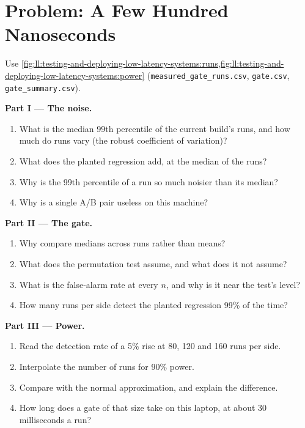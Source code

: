 \section{Problem: A Few Hundred Nanoseconds}

\begin{problem}\label{pb:ll:testing-and-deploying-low-latency-systems:1}
Use \cref{fig:ll:testing-and-deploying-low-latency-systems:runs,fig:ll:testing-and-deploying-low-latency-systems:power}
(\texttt{measured\_gate\_runs.csv}, \texttt{gate.csv}, \texttt{gate\_summary.csv}).

\medskip\noindent\textbf{Part I --- The noise.}
\begin{enumerate}
\item What is the median 99th percentile of the current build's runs, and how much do runs vary (the robust coefficient of
variation)?
\item What does the planted regression add, at the median of the runs?
\item Why is the 99th percentile of a run so much noisier than its median?
\item Why is a single A/B pair useless on this machine?
\end{enumerate}

\medskip\noindent\textbf{Part II --- The gate.}
\begin{enumerate}[resume]
\item Why compare medians across runs rather than means?
\item What does the permutation test assume, and what does it not assume?
\item What is the false-alarm rate at every $n$, and why is it near the test's level?
\item How many runs per side detect the planted regression 99\% of the time?
\end{enumerate}

\medskip\noindent\textbf{Part III --- Power.}
\begin{enumerate}[resume]
\item Read the detection rate of a 5\% rise at 80, 120 and 160 runs per side.
\item Interpolate the number of runs for 90\% power.
\item Compare with the normal approximation, and explain the difference.
\item How long does a gate of that size take on this laptop, at about 30 milliseconds a run?
\end{enumerate}


\end{problem}
